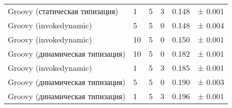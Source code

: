 \begin{table}[h]
\begin{center}
\begin{tabular}{|l|p{}|p{}|p{}|p{}|l|}
Groovy (статическая типизация)  & 1 & 5 & 3                 & 0.148 & ±  0.001 \\
Groovy (invokedynamic)          & 5 & 5 & 0                 & 0.148 & ±  0.004 \\
Groovy (invokedynamic)          & 10 & 5 & 0                & 0.150 & ±  0.001 \\
Groovy (динамическая типизация) & 10 & 5 & 0                & 0.182 & ±  0.001 \\
Groovy (invokedynamic)          & 1 & 5 & 3                 & 0.185 & ±  0.001 \\
Groovy (динамическая типизация) & 5 & 5 & 0                 & 0.190 & ±  0.003 \\
Groovy (динамическая типизация) & 1 & 5 & 3                 & 0.196 & ±  0.001 \\
\hline
\end{tabular}
\end{center}
\end{table} 



